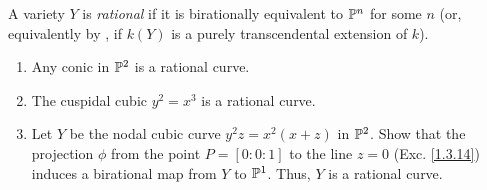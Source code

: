 \label{1.4.4}

A variety $Y$ is \emph{rational} if it is birationally equivalent to $\P^n$ for some $n$ (or, equivalently by \cite[I.4.5]{hartshorne}, if $k(Y)$ is a purely transcendental extension of $k$).

\begin{enumerate}[label = (\alph*)]
    \item Any conic in $\P^2$ is a rational curve.

    \item The cuspidal cubic $y^2 = x^3$ is a rational curve.

    \item Let $Y$ be the nodal cubic curve $y^2 z = x^2 (x + z)$ in $\P^2$. Show that the projection $\phi$ from the point $P = [0 : 0 : 1]$ to the line $z = 0$ (Exc. \ref{1.3.14}) induces a birational map from $Y$ to $\P^1$. Thus, $Y$ is a rational curve.
\end{enumerate}

